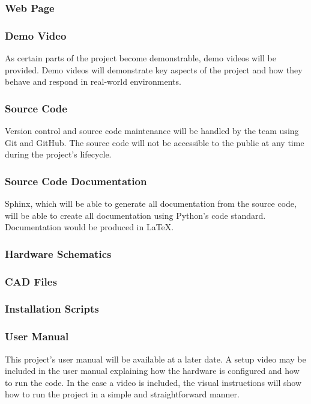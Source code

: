 \subsubsection{Web Page}

\subsubsection{Demo Video}
As certain parts of the project become demonstrable, demo videos will be provided. Demo videos will demonstrate key aspects of the project and how they behave and respond in real-world environments.

\subsubsection{Source Code}
Version control and source code maintenance will be handled by the team using Git and GitHub. The source code will not be accessible to the public at any time during the project's lifecycle.

\subsubsection{Source Code Documentation}
Sphinx, which will be able to generate all documentation from the source code, will be able to create all documentation using Python's code standard. Documentation would be produced in LaTeX.

\subsubsection{Hardware Schematics}

\subsubsection{CAD Files}

\subsubsection{Installation Scripts}

\subsubsection{User Manual}
This project's user manual will be available at a later date. A setup video may be included in the user manual explaining how the hardware is configured and how to run the code. In the case a video is included, the visual instructions will show how to run the project in a simple and straightforward manner.
